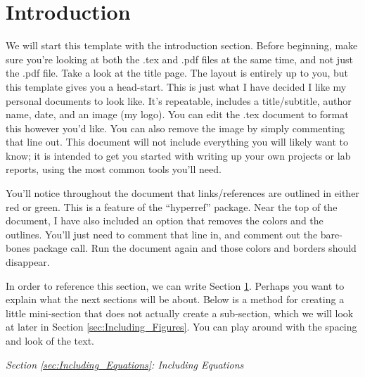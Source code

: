 \documentclass[letterpaper,12pt]{article}
\begin{document}
\pagestyle{headings}				%

\section{Introduction}
\label{sec:Introduction}

We will start this template with the introduction section.  Before beginning, make sure you're looking at both the .tex and .pdf files at the same time, and not just the .pdf file.  Take a look at the title page.  The layout is entirely up to you, but this template gives you a head-start.  This is just what I have decided I like my personal documents to look like.  It's repeatable, includes a title/subtitle, author name, date, and an image (my logo).  You can edit the .tex document to format this however you'd like.  You can also remove the image by simply commenting that line out.  This document will not include everything you will likely want to know; it is intended to get you started with writing up your own projects or lab reports, using the most common tools you'll need.

You'll notice throughout the document that links/references are outlined in either red or green.  This is a feature of the ``hyperref'' package.  Near the top of the document, I have also included an option that removes the colors and the outlines.  You'll just need to comment that line in, and comment out the bare-bones package call.  Run the document again and those colors and borders should disappear.

In order to reference this section, we can write Section \ref{sec:Introduction}.  Perhaps you want to explain what the next sections will be about.  Below is a method for creating a little mini-section that does not actually create a sub-section, which we will look at later in Section \ref{sec:Including_Figures}.  You can play around with the spacing and look of the text.

\vspace{1em}
\noindent \emph{Section \ref{sec:Including_Equations}: Including Equations}
\vspace{1em}
\end{document}
